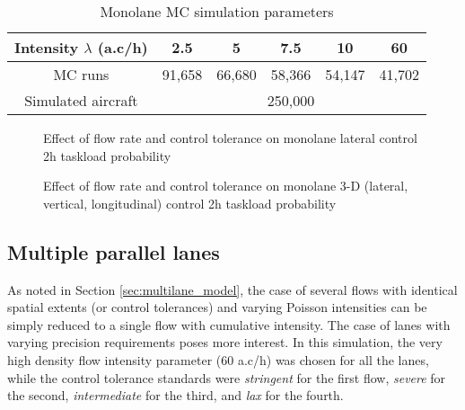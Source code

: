 \documentclass[conference]{IEEEtran}
\begin{document}
\begin{table}
\caption{Monolane MC simulation parameters}
\label{tab:1flow_MC}
\centering
\begin{tabular}{|c|c|c|c|c|c|}
\hline\hline 
Intensity $\lambda$ (a.c/h)&  2.5 & 5 & 7.5 & 10 & 60 \bigstrut\\ \hline
MC runs& 91,658 & 66,680 & 58,366 & 54,147 & 41,702 \bigstrut \\ \hline
Simulated aircraft & \multicolumn{5}{c|}{250,000} \bigstrut \\ \hline\hline
\end{tabular}
\end{table}


\begin{figure}[!h]
\centering
{}
\caption{Effect of flow rate and control tolerance on monolane lateral control 2h taskload probability}
\label{fig:task_lat_1fl}
\end{figure}


\begin{figure}[!h]
\centering
{}
\caption{Effect of flow rate and control tolerance on monolane 3-D (lateral, vertical, longitudinal) control 2h taskload probability}
\label{fig:task_tot_1fl}
\end{figure}


\subsection{Multiple parallel lanes}

As noted in Section \ref{sec:multilane_model}, the case of several flows with identical spatial extents (or control tolerances) and varying Poisson intensities can be simply reduced to a single flow with cumulative intensity. The case of lanes with varying precision requirements poses more interest. In this simulation, the very high density flow intensity parameter (60 a.c/h) was chosen for all the lanes, while the control tolerance standards were \emph{stringent} for the first flow, \emph{severe} for the second, \emph{intermediate} for the third, and \emph{lax} for the fourth.
\end{document}
